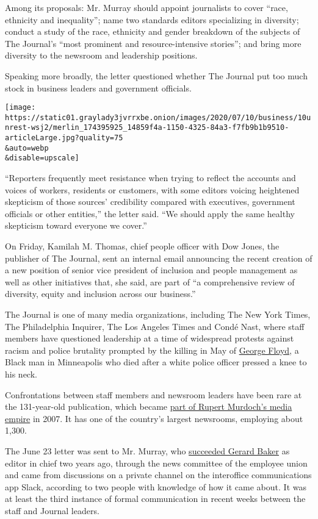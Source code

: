 Among its proposals: Mr. Murray should appoint journalists to cover
``race, ethnicity and inequality''; name two standards editors
specializing in diversity; conduct a study of the race, ethnicity and
gender breakdown of the subjects of The Journal's ``most prominent and
resource-intensive stories''; and bring more diversity to the newsroom
and leadership positions.

Speaking more broadly, the letter questioned whether The Journal put too
much stock in business leaders and government officials.

\texttt{[image: https://static01.graylady3jvrrxbe.onion/images/2020/07/10/business/10unrest-wsj2/merlin\_174395925\_14859f4a-1150-4325-84a3-f7fb9b1b9510-articleLarge.jpg?quality=75\\\&auto=webp\\\&disable=upscale]}

``Reporters frequently meet resistance when trying to reflect the
accounts and voices of workers, residents or customers, with some
editors voicing heightened skepticism of those sources' credibility
compared with executives, government officials or other entities,'' the
letter said. ``We should apply the same healthy skepticism toward
everyone we cover.''

On Friday, Kamilah M. Thomas, chief people officer with Dow Jones, the
publisher of The Journal, sent an internal email announcing the recent
creation of a new position of senior vice president of inclusion and
people management as well as other initiatives that, she said, are part
of ``a comprehensive review of diversity, equity and inclusion across
our business.''

The Journal is one of many media organizations, including The New York
Times, The Philadelphia Inquirer, The Los Angeles Times and Condé Nast,
where staff members have questioned leadership at a time of widespread
protests against racism and police brutality prompted by the killing in
May of
\href{https://www.nytimes3xbfgragh.onion/2020/07/08/us/george-floyd-body-camera-transcripts.html}{George
Floyd}, a Black man in Minneapolis who died after a white police officer
pressed a knee to his neck.

Confrontations between staff members and newsroom leaders have been rare
at the 131-year-old publication, which became
\href{https://www.nytimes3xbfgragh.onion/2007/05/04/business/media/04murdoch.html}{part
of Rupert Murdoch's media empire} in 2007. It has one of the country's
largest newsrooms, employing about 1,300.

The June 23 letter was sent to Mr. Murray, who
\href{https://www.nytimes3xbfgragh.onion/2018/06/05/business/media/wall-street-journal-editor-gerry-baker-matt-murray.html}{succeeded
Gerard Baker} as editor in chief two years ago, through the news
committee of the employee union and came from discussions on a private
channel on the interoffice communications app Slack, according to two
people with knowledge of how it came about. It was at least the third
instance of formal communication in recent weeks between the staff and
Journal leaders.

